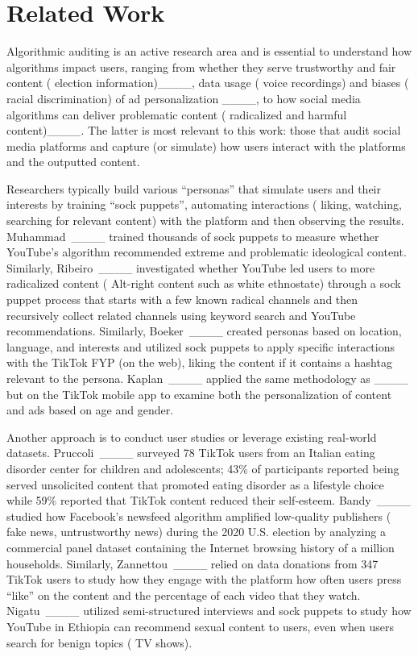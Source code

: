 \section{Related Work}
\label{sec:background-related-work}

Algorithmic auditing is an active research area and is essential to understand how algorithms impact users, ranging from whether they serve trustworthy and fair content (\eg{} election information)____, data usage (\eg{} voice recordings) and biases (\eg{} racial discrimination) of ad personalization ____, to how social media algorithms can deliver problematic content (\eg{} radicalized and harmful content)____.
The latter is most relevant to this work: those that audit social media platforms and capture (or simulate) how users interact with the platforms and the outputted content. 

Researchers typically build various ``personas'' that simulate users and their interests by training ``sock puppets'', \ie{} automating interactions (\eg{} liking, watching, searching for relevant content) with the platform and then observing the results. %
Muhammad~\etal{}____ trained thousands of sock puppets to measure whether YouTube's algorithm recommended extreme and problematic ideological content. Similarly, Ribeiro~\etal{}____ investigated whether YouTube led users to more radicalized content (\eg{} Alt-right content such as white ethnostate) through a sock puppet process that starts with a few known radical channels and then recursively collect related channels using keyword search and YouTube recommendations. Similarly, Boeker~\etal{}____ created personas based on location, language, and interests and utilized sock puppets to apply specific interactions with the TikTok FYP (on the web), \eg{} liking the content if it contains a hashtag relevant to the persona. Kaplan~\etal{}____ applied the same methodology as ____ but on the TikTok mobile app to examine both the personalization of content and ads based on age and gender.

Another approach is to conduct user studies or leverage existing real-world datasets.
Pruccoli~\etal{}____ surveyed 78 TikTok users from an Italian eating disorder center for children and adolescents; 43\% of participants reported being served unsolicited content that promoted eating disorder as a lifestyle choice while 59\% reported that TikTok content reduced their self-esteem.
Bandy~\etal{}____ studied how Facebook's newsfeed algorithm amplified low-quality publishers (\eg{} fake news, untrustworthy news) during the 2020 U.S. election by analyzing a commercial panel dataset containing the Internet browsing history of a million households. 
Similarly, Zannettou~\etal{}____ relied on data donations from 347 TikTok users to study how they engage with the platform \eg{} how often users press ``like'' on the content and the percentage of each video that they watch. 
Nigatu~\etal{}____ utilized semi-structured interviews and sock puppets to study how YouTube in Ethiopia can recommend sexual content to users, even when users search for benign topics (\eg{} TV shows). 

